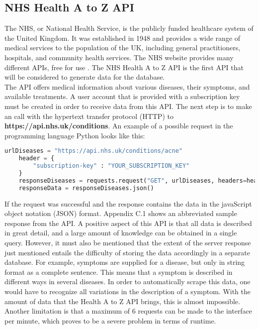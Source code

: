 \subsection{NHS Health A to Z API}
The NHS, or National Health Service, is the publicly funded healthcare system of the United Kingdom. It was established in 1948 and provides a wide range of medical services to the population of the UK, including general practitioners, hospitals, and community health services. The NHS website provides many different APIs, free for use \cite{.nhs}. The NHS Health A to Z API is the first API that will be considered to generate data for the database.
\newline \\
The API offers medical information about various diseases, their symptoms, and available treatments. A user account that is provided with a subscription key must be created in order to receive data from this API. The next step is to make an call with the hypertext transfer protocol (HTTP) to \textbf{https://api.nhs.uk/conditions}. An example of a possible request in the programming language Python looks like this:
\begin{lstlisting}[language=Python, caption={Example Python Request for the Health A to Z API}]
	urlDiseases = "https://api.nhs.uk/conditions/acne"
	header = {
		"subscription-key" : "YOUR_SUBSCRIPTION_KEY"
	}
	responseDiseases = requests.request("GET", urlDiseases, headers=header)
	responseData = responseDiseases.json()
\end{lstlisting}
If the request was successful and the response contains the data in the javaScript object notation (JSON) format. Appendix C.1 shows an abbreviated sample response from the API. A positive aspect of this API is that all data is described in great detail, and a large amount of knowledge can be obtained in a single query. However, it must also be mentioned that the extent of the server response just mentioned entails the difficulty of storing the data accordingly in a separate database. For example, symptoms are supplied for a disease, but only in string format as a complete sentence. This means that a symptom is described in different ways in several diseases. In order to automatically scrape this data, one would have to recognize all variations in the description of a symptom. With the amount of data that the Health A to Z API brings, this is almost impossible. Another limitation is that a maximum of 6 requests can be made to the interface per minute, which proves to be a severe problem in terms of runtime.

